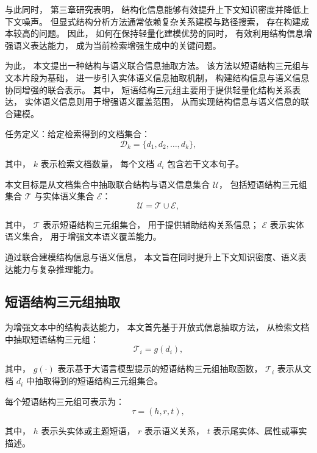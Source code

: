 与此同时，
第三章研究表明，
结构化信息能够有效提升上下文知识密度并降低上下文噪声。
但显式结构分析方法通常依赖复杂关系建模与路径搜索，
存在构建成本较高的问题。
因此，
如何在保持轻量化建模优势的同时，
有效利用结构信息增强语义表达能力，
成为当前检索增强生成中的关键问题。

为此，
本文提出一种结构与语义联合信息抽取方法。
该方法以短语结构三元组与文本片段为基础，
进一步引入实体语义信息抽取机制，
构建结构信息与语义信息协同增强的联合表示。
其中，
短语结构三元组主要用于提供轻量化结构关系表达，
实体语义信息则用于增强语义覆盖范围，
从而实现结构信息与语义信息的联合建模。

任务定义：给定检索得到的文档集合：
\begin{equation}
\mathcal{D}_k = \{d_1,d_2,\dots,d_k\},
\end{equation}

\noindent 其中，
$k$ 表示检索文档数量，
每个文档 $d_i$ 包含若干文本句子。

本文目标是从文档集合中抽取联合结构与语义信息集合 $\mathcal{U}$，
包括短语结构三元组集合 $\mathcal{T}$ 与实体语义集合 $\mathcal{E}$：
\begin{equation}
\mathcal{U} = \mathcal{T} \cup \mathcal{E},
\end{equation}

\noindent 其中，
$\mathcal{T}$ 表示短语结构三元组集合，
用于提供辅助结构关系信息；
$\mathcal{E}$ 表示实体语义集合，
用于增强文本语义覆盖能力。

通过联合建模结构信息与语义信息，
本文旨在同时提升上下文知识密度、语义表达能力与复杂推理能力。

\subsection{短语结构三元组抽取}

为增强文本中的结构表达能力，
本文首先基于开放式信息抽取方法，
从检索文档中抽取短语结构三元组：
\begin{equation}
\mathcal{T}_i = g(d_i),
\end{equation}

\noindent 其中，
$g(\cdot)$ 表示基于大语言模型提示的短语结构三元组抽取函数，
$\mathcal{T}_i$ 表示从文档 $d_i$ 中抽取得到的短语结构三元组集合。

每个短语结构三元组可表示为：
\begin{equation}
\tau=(h,r,t),
\end{equation}

\noindent 其中，
$h$ 表示头实体或主题短语，
$r$ 表示语义关系，
$t$ 表示尾实体、属性或事实描述。

